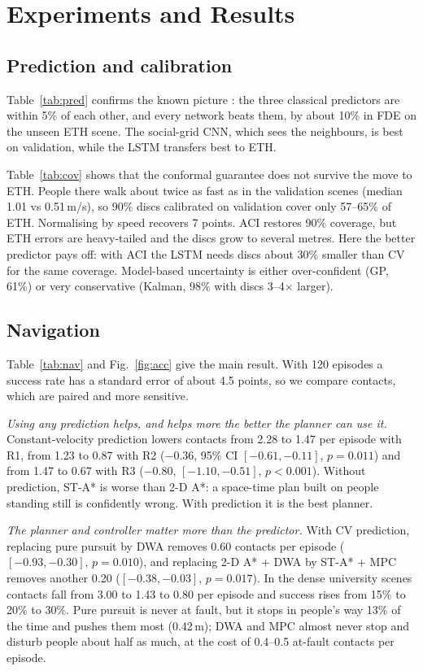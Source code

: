 \section{Experiments and Results}


\subsection{Prediction and calibration}
Table~\ref{tab:pred} confirms the known picture \cite{scholler2020}: the
three classical predictors are within 5\% of each other, and every network
beats them, by about 10\% in FDE on the unseen ETH scene. The social-grid
CNN, which sees the neighbours, is best on validation, while the LSTM
transfers best to ETH.

Table~\ref{tab:cov} shows that the conformal guarantee does not survive
the move to ETH. People there walk about twice as fast as in the
validation scenes (median 1.01 vs 0.51\,m/s), so 90\% discs calibrated on
validation cover only 57--65\% of ETH. Normalising by speed recovers 7
points. ACI restores 90\% coverage, but ETH errors are heavy-tailed and
the discs grow to several metres. Here the better predictor pays off: with
ACI the LSTM needs discs about 30\% smaller than CV for the same coverage.
Model-based uncertainty is either over-confident (GP, 61\%) or very
conservative (Kalman, 98\% with discs 3--4$\times$ larger).

\subsection{Navigation}
Table~\ref{tab:nav} and Fig.~\ref{fig:acc} give the main result. With 120
episodes a success rate has a standard error of about 4.5 points, so we
compare contacts, which are paired and more sensitive.

\emph{Using any prediction helps, and helps more the better the planner
can use it.} Constant-velocity prediction lowers contacts from 2.28 to
1.47 per episode with R1, from 1.23 to 0.87 with R2 ($-0.36$, 95\% CI
$[-0.61,-0.11]$, $p=0.011$) and from 1.47 to 0.67 with R3 ($-0.80$,
$[-1.10,-0.51]$, $p<0.001$). Without prediction, ST-A* is worse than
2-D A*: a space-time plan built on people standing still is confidently
wrong. With prediction it is the best planner.

\emph{The planner and controller matter more than the predictor.} With CV
prediction, replacing pure pursuit by DWA removes 0.60 contacts per episode
($[-0.93,-0.30]$, $p=0.010$), and replacing 2-D A* + DWA by ST-A* + MPC
removes another 0.20 ($[-0.38,-0.03]$, $p=0.017$). In the dense
university scenes contacts fall from 3.00 to 1.43 to 0.80 per episode and
success rises from 15\% to 20\% to 30\%. Pure pursuit is never at fault,
but it stops in people's way 13\% of the time and pushes them most
(0.42\,m); DWA and MPC almost never stop and disturb people about half as
much, at the cost of 0.4--0.5 at-fault contacts per episode.

